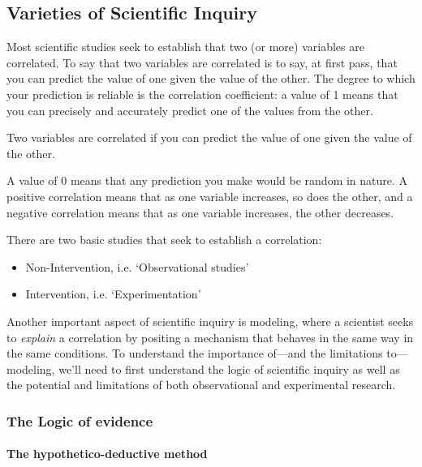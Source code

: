 \begin{refsection}
\subsection{Varieties of Scientific Inquiry}
\label{varietiesofscientificinquiry}

Most scientific studies seek to establish that two (or more) variables are correlated. To say that two variables are correlated is to say, at first pass, that you can predict the value of one given the value of the other. The degree to which your prediction is reliable is the correlation coefficient: a value of 1 means that you can precisely and accurately predict one of the values from the other. \begin{thesis}[Correlation]Two variables are correlated if you can predict the value of one given the value of the other.\end{thesis}

A value of 0 means that any prediction you make would be random in nature. A positive correlation means that as one variable increases, so does the other, and a negative correlation means that as one variable increases, the other decreases. 

There are two basic studies that seek to establish a correlation:

\begin{itemize}
\item Non-Intervention, i.e. ‘Observational studies’

\item Intervention, i.e. ‘Experimentation’

\end{itemize}

Another important aspect of scientific inquiry is modeling, where a scientist seeks to \emph{explain} a correlation by positing a mechanism that behaves in the same way in the same conditions. To understand the importance of---and the limitations to---modeling, we’ll need to first understand the logic of scientific inquiry as well as the potential and limitations of both observational and experimental research.

\subsubsection{The Logic of evidence}
\label{thelogicofevidence}

\paragraph{The hypothetico-deductive method}
\label{thehypothetico-deductivemethod}


\end{refsection}
